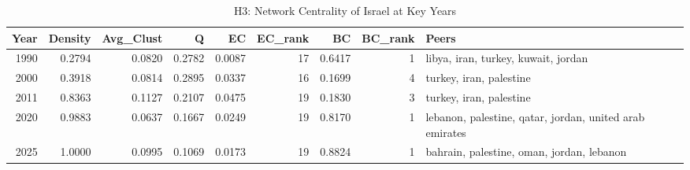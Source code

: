 \begin{table}
\caption{H3: Network Centrality of Israel at Key Years}
\label{tab:h3_centrality_keyYears}
\begin{tabular}{rrrrrrrrl}
\toprule
Year & Density & Avg\_Clust & Q & EC & EC\_rank & BC & BC\_rank & Peers \\
\midrule
1990 & 0.2794 & 0.0820 & 0.2782 & 0.0087 & 17 & 0.6417 & 1 & libya, iran, turkey, kuwait, jordan \\
2000 & 0.3918 & 0.0814 & 0.2895 & 0.0337 & 16 & 0.1699 & 4 & turkey, iran, palestine \\
2011 & 0.8363 & 0.1127 & 0.2107 & 0.0475 & 19 & 0.1830 & 3 & turkey, iran, palestine \\
2020 & 0.9883 & 0.0637 & 0.1667 & 0.0249 & 19 & 0.8170 & 1 & lebanon, palestine, qatar, jordan, united arab emirates \\
2025 & 1.0000 & 0.0995 & 0.1069 & 0.0173 & 19 & 0.8824 & 1 & bahrain, palestine, oman, jordan, lebanon \\
\bottomrule
\end{tabular}
\end{table}
